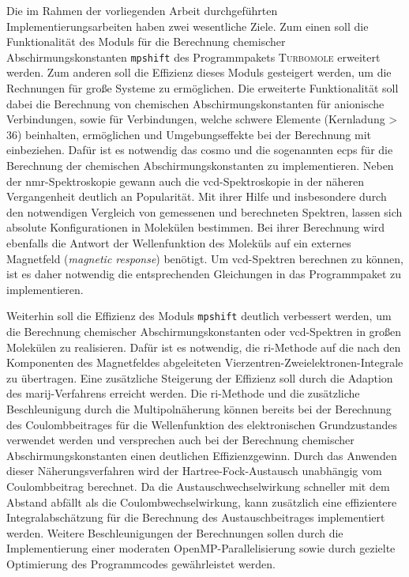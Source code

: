 \bigskip
Die im Rahmen der vorliegenden Arbeit durchgeführten Implementierungsarbeiten haben zwei wesentliche Ziele. Zum einen soll die Funktionalität des Moduls für die Berechnung chemischer Abschirmungskonstanten \texttt{mpshift}\supercite{haser1992direct,kollwitz1996direct} des Programmpakets \textsc{Turbomole}\supercite{ahlrichs1989electronic,TURBOMOLE,furche2014turbomole} erweitert werden. Zum anderen soll die Effizienz dieses Moduls gesteigert werden, um die Rechnungen für große Systeme zu ermöglichen. Die erweiterte Funktionalität soll dabei die Berechnung von chemischen Abschirmungskonstanten für anionische Verbindungen, sowie für Verbindungen, welche schwere Elemente (Kernladung > 36) beinhalten, ermöglichen und Umgebungseffekte bei der Berechnung mit einbeziehen. Dafür ist es notwendig das \ac{cosmo}\supercite{klamt1993cosmo} und die sogenannten \acp{ecp} für die Berechnung der chemischen Abschirmungskonstanten zu implementieren. Neben der \ac{nmr}-Spektroskopie gewann auch die \ac{vcd}-Spektroskopie in der näheren Vergangenheit deutlich an Popularität. Mit ihrer Hilfe und insbesondere durch den notwendigen Vergleich von gemessenen und berechneten Spektren, lassen sich absolute Konfigurationen in Molekülen bestimmen. Bei ihrer Berechnung wird ebenfalls die Antwort der Wellenfunktion des Moleküls auf ein externes Magnetfeld (\textit{magnetic response}) benötigt. Um \ac{vcd}-Spektren berechnen zu können, ist es daher notwendig die entsprechenden Gleichungen in das Programmpaket zu implementieren. 

Weiterhin soll die Effizienz des Moduls \texttt{mpshift} deutlich verbessert werden, um die Berechnung chemischer Abschirmungskonstanten oder \ac{vcd}-Spektren in großen Molekülen zu realisieren. Dafür ist es notwendig, die \ac{ri}-Methode auf die nach den Komponenten des Magnetfeldes abgeleiteten Vierzentren-Zweielektronen-Integrale zu übertragen. Eine zusätzliche Steigerung der Effizienz soll durch die Adaption des \ac{marij}-Verfahrens\supercite{sierka2003fast} erreicht werden. Die \ac{ri}-Methode und die zusätzliche Beschleunigung durch die Multipolnäherung können bereits bei der Berechnung des Coulombbeitrages für die Wellenfunktion des elektronischen Grundzustandes verwendet werden und versprechen auch bei der Berechnung chemischer Abschirmungskonstanten einen deutlichen Effizienzgewinn. Durch das Anwenden dieser Näherungsverfahren wird der Hartree-Fock-Austausch unabhängig vom Coulombbeitrag berechnet. Da die Austauschwechselwirkung schneller mit dem Abstand abfällt als die Coulombwechselwirkung, kann zusätzlich eine effizientere Integralabschätzung für die Berechnung des Austauschbeitrages implementiert werden. Weitere Beschleunigungen der Berechnungen sollen durch die Implementierung einer moderaten OpenMP-Parallelisierung sowie durch gezielte Optimierung des Programmcodes gewährleistet werden. 

